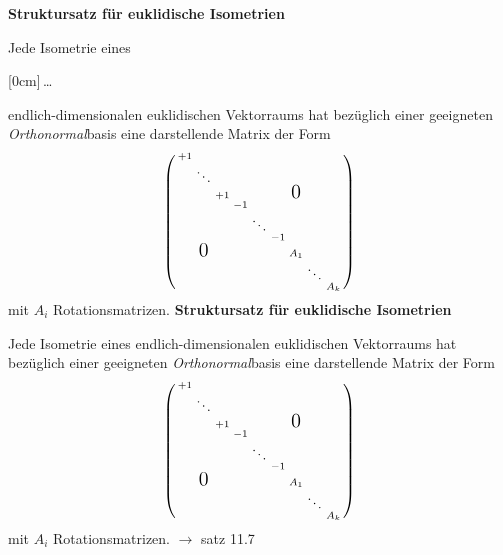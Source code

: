 \documentclass[11pt]{article}
\renewcommand{\cite}[1]{\par\bigskip\hfill{\color{gray}\tiny\(\to\) #1}}
\newcommand{\hide}[1]{\parbox{0cm}{\raisebox{-7pt}[0cm]{\dots}}\color{white}#1\color{black}}
\let\olddots\dots
\renewcommand{\dots}{\,\olddots\,}
\newenvironment{field}{}{\newpage}
\newif\ifnote
\newenvironment{note}{\notetrue}{\notefalse}
\newcommand{\localtag}{}
\newcommand{\globaltag}{}
\newcommand{\uuid}{}
\newcommand{\tags}[1]{
    \ifnote
        \renewcommand{\localtag}{#1}
    \else
        \renewcommand{\globaltag}{#1}
    \fi
    }
\newcommand{\xplain}[1]{\renewcommand{\uuid}{#1}}
\begin{document}
\begin{note}
    \renewcommand{\cite}[1]{\bigskip\hfill{\color{gray}\tiny\(\to\) #1}}
    \tags{Satz}
    \xplain{b2f42114-c30d-11ec-9d64-0242ac120002}
    \begin{field}
        \textbf{Struktursatz für euklidische Isometrien}

        Jede Isometrie eines \hide{endlich-dimensionalen} euklidischen Vektorraums hat bezüglich einer geeigneten \emph{Orthonormal}basis eine darstellende Matrix der Form
        \[\left(\begin{smallmatrix}
            +1 \\
              & \ddots \\
              &        & +1 &  &       &  &     \mbox{\Large 0}\\
              &        &    &-1\\
              &        &    &  &\ddots\\
              &        &    &  &       &-1\\
              &\mbox{\Large 0}&    &  &       &  & A_1\\
              &        &    &  &       &  &     &\ddots\\
              &        &    &  &       &  &     &       & A_k\\
        \end{smallmatrix}\right)\]
        mit \(A_i\) Rotationsmatrizen.
    \end{field}
    \begin{field}
        \textbf{Struktursatz für euklidische Isometrien}

        Jede Isometrie eines endlich-dimensionalen euklidischen Vektorraums hat bezüglich einer geeigneten \emph{Orthonormal}basis eine darstellende Matrix der Form
        \[\left(\begin{smallmatrix}
            +1 \\
              & \ddots \\
              &        & +1 &  &       &  &     \mbox{\Large 0}\\
              &        &    &-1\\
              &        &    &  &\ddots\\
              &        &    &  &       &-1\\
              &\mbox{\Large 0}&    &  &       &  & A_1\\
              &        &    &  &       &  &     &\ddots\\
              &        &    &  &       &  &     &       & A_k\\
        \end{smallmatrix}\right)\]
        mit \(A_i\) Rotationsmatrizen.
        \cite{satz 11.7}
    \end{field}


\end{note}
\end{document}

